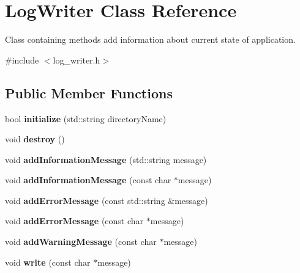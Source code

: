 \hypertarget{class_log_writer}{}\section{Log\+Writer Class Reference}
\label{class_log_writer}


Class containing methods add information about current state of application.  




{\ttfamily \#include $<$log\+\_\+writer.\+h$>$}

\subsection*{Public Member Functions}
\begin{DoxyCompactItemize}
\item 
\hypertarget{class_log_writer_a1cedcc7f343d59239d4c9f366418d44e}{}\label{class_log_writer_a1cedcc7f343d59239d4c9f366418d44e} 
bool {\bfseries initialize} (std\+::string directory\+Name)
\item 
\hypertarget{class_log_writer_a42c6726ace5a0b60311978edd9303a3f}{}\label{class_log_writer_a42c6726ace5a0b60311978edd9303a3f} 
void {\bfseries destroy} ()
\item 
\hypertarget{class_log_writer_a1ce4389bff086f329383741f066f877a}{}\label{class_log_writer_a1ce4389bff086f329383741f066f877a} 
void {\bfseries add\+Information\+Message} (std\+::string message)
\item 
\hypertarget{class_log_writer_afe4e4ca6202ee9794d78dce5dad3af79}{}\label{class_log_writer_afe4e4ca6202ee9794d78dce5dad3af79} 
void {\bfseries add\+Information\+Message} (const char $\ast$message)
\item 
\hypertarget{class_log_writer_aa4ac503f2f74bd35f5b626f134f9315a}{}\label{class_log_writer_aa4ac503f2f74bd35f5b626f134f9315a} 
void {\bfseries add\+Error\+Message} (const std\+::string \&message)
\item 
\hypertarget{class_log_writer_a42b4eddd43eef58d97b87580fed2b85e}{}\label{class_log_writer_a42b4eddd43eef58d97b87580fed2b85e} 
void {\bfseries add\+Error\+Message} (const char $\ast$message)
\item 
\hypertarget{class_log_writer_a7d23476cc15635eb47f0edd9f9b74a3f}{}\label{class_log_writer_a7d23476cc15635eb47f0edd9f9b74a3f} 
void {\bfseries add\+Warning\+Message} (const char $\ast$message)
\item 
\hypertarget{class_log_writer_a39801f380662e1bb771e1f8ee991beac}{}\label{class_log_writer_a39801f380662e1bb771e1f8ee991beac} 
void {\bfseries write} (const char $\ast$message)
\end{DoxyCompactItemize}
